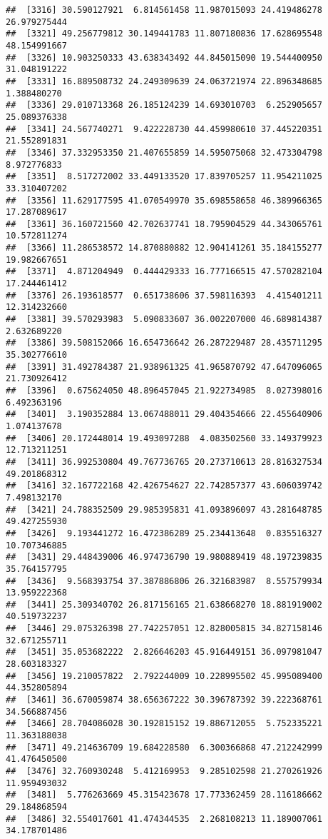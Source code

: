 \documentclass[
]{article}
\begin{document}
\begin{verbatim}
##  [3316] 30.590127921  6.814561458 11.987015093 24.419486278 26.979275444
##  [3321] 49.256779812 30.149441783 11.807180836 17.628695548 48.154991667
##  [3326] 10.903250333 43.638343492 44.845015090 19.544400950 31.048191222
##  [3331] 16.889508732 24.249309639 24.063721974 22.896348685  1.388480270
##  [3336] 29.010713368 26.185124239 14.693010703  6.252905657 25.089376338
##  [3341] 24.567740271  9.422228730 44.459980610 37.445220351 21.552891831
##  [3346] 37.332953350 21.407655859 14.595075068 32.473304798  8.972776833
##  [3351]  8.517272002 33.449133520 17.839705257 11.954211025 33.310407202
##  [3356] 11.629177595 41.070549970 35.698558658 46.389966365 17.287089617
##  [3361] 36.160721560 42.702637741 18.795904529 44.343065761 10.572811274
##  [3366] 11.286538572 14.870880882 12.904141261 35.184155277 19.982667651
##  [3371]  4.871204949  0.444429333 16.777166515 47.570282104 17.244461412
##  [3376] 26.193618577  0.651738606 37.598116393  4.415401211 12.314232660
##  [3381] 39.570293983  5.090833607 36.002207000 46.689814387  2.632689220
##  [3386] 39.508152066 16.654736642 26.287229487 28.435711295 35.302776610
##  [3391] 31.492784387 21.938961325 41.965870792 47.647096065 21.730926412
##  [3396]  0.675624050 48.896457045 21.922734985  8.027398016  6.492363196
##  [3401]  3.190352884 13.067488011 29.404354666 22.455640906  1.074137678
##  [3406] 20.172448014 19.493097288  4.083502560 33.149379923 12.713211251
##  [3411] 36.992530804 49.767736765 20.273710613 28.816327534 49.201868312
##  [3416] 32.167722168 42.426754627 22.742857377 43.606039742  7.498132170
##  [3421] 24.788352509 29.985395831 41.093896097 43.281648785 49.427255930
##  [3426]  9.193441272 16.472386289 25.234413648  0.835516327 10.707346885
##  [3431] 29.448439006 46.974736790 19.980889419 48.197239835 35.764157795
##  [3436]  9.568393754 37.387886806 26.321683987  8.557579934 13.959222368
##  [3441] 25.309340702 26.817156165 21.638668270 18.881919002 40.519732237
##  [3446] 29.075326398 27.742257051 12.828005815 34.827158146 32.671255711
##  [3451] 35.053682222  2.826646203 45.916449151 36.097981047 28.603183327
##  [3456] 19.210057822  2.792244009 10.228995502 45.995089400 44.352805894
##  [3461] 36.670059874 38.656367222 30.396787392 39.222368761 34.566887456
##  [3466] 28.704086028 30.192815152 19.886712055  5.752335221 11.363188038
##  [3471] 49.214636709 19.684228580  6.300366868 47.212242999 41.476450500
##  [3476] 32.760930248  5.412169953  9.285102598 21.270261926 11.959493032
##  [3481]  5.776263669 45.315423678 17.773362459 28.116186662 29.184868594
##  [3486] 32.554017601 41.474344535  2.268108213 11.189007061 34.178701486

\end{verbatim}
\end{document}
